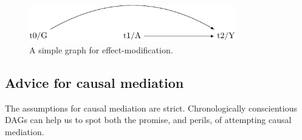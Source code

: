 \documentclass[
  singlecolumn]{report}
\begin{document}
\begin{figure}

{\centering \includegraphics[width=0.8\textwidth,height=\textheight]{causal-dags_files/figure-pdf/fig-dag-effect-modfication-1.pdf}

}

\caption{\label{fig-dag-effect-modfication}A simple graph for
effect-modification.}

\end{figure}

\hypertarget{advice-for-causal-mediation}{%
\subsection{Advice for causal
mediation}\label{advice-for-causal-mediation}}

The assumptions for causal mediation are strict. Chronologically
conscientious DAGs can help us to spot both the promise, and perils, of
attempting causal mediation.
\end{document}
